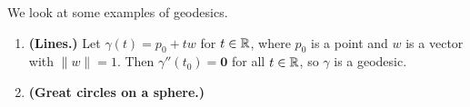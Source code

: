 We look at some examples of geodesics. 
\begin{enumerate}[(1)]
    \item {\bf (Lines.)} Let $\gamma(t) = p_0 + tw$ for $t \in \mathbb{R}$, 
    where $p_0$ is a point and $w$ is a vector with $\|w\| = 1$. 
    Then $\gamma''(t_0) = \mathbf 0$ for all $t \in \mathbb{R}$, so $\gamma$ is a geodesic.
    \item {\bf (Great circles on a sphere.)} 
\end{enumerate}